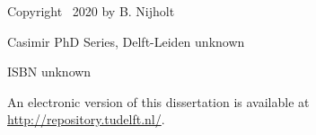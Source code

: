 \begin{titlepage}
\vspace{1\bigskipamount}

\noindent Copyright \textcopyright\ 2020 by B. Nijholt

\medskip
\noindent Casimir PhD Series, Delft-Leiden unknown  %

\medskip
\noindent ISBN unknown

\medskip
\noindent An electronic version of this dissertation is available at \\
\url{http://repository.tudelft.nl/}.

\end{titlepage}
